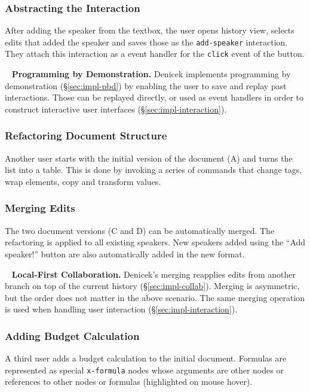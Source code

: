 \documentclass[sigconf,anonymous,screen]{acmart}
\newcommand*\circled[1]{\textnormal{\footnotesize\sffamily\bfseries\protect\tikz[baseline=(char.base)]{
  \node[shape=circle,fill=black,text=white,draw,inner sep=1pt] (char) {#1};}}}
\DeclareRobustCommand{\keyideabox}[3]{\begin{tcolorbox}[breakable,
  boxsep=5pt,left=0pt,right=0pt,top=0pt,bottom=0pt,width=\dimexpr\columnwidth\relax,
  colback=gray!20,colframe=gray!20,
  enlarge bottom by=0pt,enlarge top by=0pt,
  arc=0pt,outer arc=0pt]
\lettrine[lraise=0.3]{\LARGE #1}{~}
\small \textbf{#2.} #3
\end{tcolorbox}
}
\begin{document}
\subsubsection*{\circled{C} Abstracting the Interaction} After adding the speaker from the textbox,
the user opens history view, selects edits that added the speaker and saves those as the
{\small\Verb_add-speaker_} interaction. They attach this interaction as a event handler for the
{\small\Verb_click_} event of the button.

\keyideabox{\faLightbulbO}{Programming by Demonstration}{Denicek implements programming by
demonstration (\S\ref{sec:impl-pbd}) by enabling the user to save and replay past interactions.
Those can be replayed directly, or used as event handlers in order to construct interactive user
interfaces (\S\ref{sec:impl-interaction}).}

\subsubsection*{\circled{D} Refactoring Document Structure} Another user starts with the initial
version of the document (A) and turns the list into a table. This is done by invoking a series of
commands that change tags, wrap elements, copy and transform values.

\subsubsection*{\circled{E} Merging Edits} The two document versions (C and D) can be automatically merged.
The refactoring is applied to all existing speakers. New speakers added using the ``Add speaker!''
button are also automatically added in the new format.

\keyideabox{\faLightbulbO}{Local-First Collaboration}{Denicek's merging
reapplies edits from another branch on top of the current history (\S\ref{sec:impl-collab}).
Merging is asymmetric, but the order does not matter in the above scenario. The same merging
operation is used when handling user interaction (\S\ref{sec:impl-interaction}).}

\subsubsection*{\circled{F} Adding Budget Calculation} A third user adds a budget calculation to
the initial document. Formulas are represented as special {\small\Verb_x-formula_} nodes whose arguments
are other nodes or references to other nodes or formulas (highlighted on mouse hover).
\end{document}
